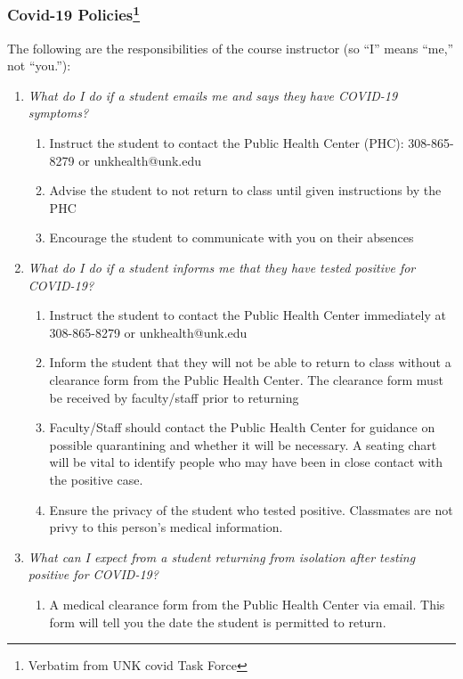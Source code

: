 \documentclass[12pt]{article}
\newcounter{ex}\setcounter{ex}{0}
\begin{document}
\subsubsection*{Covid-19 Policies\footnote{Verbatim from UNK covid Task Force}}

The following are the responsibilities of the course instructor (so ``I'' means ``me,''  not ``you.''):

\begin{enumerate}
\item \emph{What do I do if a student emails me and says they have COVID-19 symptoms?}
\begin{enumerate}
\item	Instruct the student to contact the Public Health Center (PHC): 308-865-8279 or unkhealth@unk.edu
\item	Advise the student to not return to class until given instructions by the PHC
\item	Encourage the student to communicate with you on their absences
\end{enumerate}

\item \emph{What do I do if a student informs me that they have tested positive for COVID-19?}
\begin{enumerate}
\item	Instruct the student to contact the Public Health Center immediately at 308-865-8279 or unkhealth@unk.edu
\item	Inform the student that they will not be able to return to class without a clearance form from the Public Health Center. The clearance form must be received by faculty/staff prior to returning
\item	Faculty/Staff should contact the Public Health Center for guidance on possible quarantining and whether it will be necessary. A seating chart will be vital to identify people who may have been in close contact with the positive case.
\item	Ensure the privacy of the student who tested positive. Classmates are not privy to this person’s medical information.
\end{enumerate}

\item \emph{What can I expect from a student returning from isolation after testing positive for COVID-19?}
\begin{enumerate}
\item 	A medical clearance form from the Public Health Center via email. This form will tell you the date the student is permitted to return.
\end{enumerate}


\end{enumerate}
\end{document}
